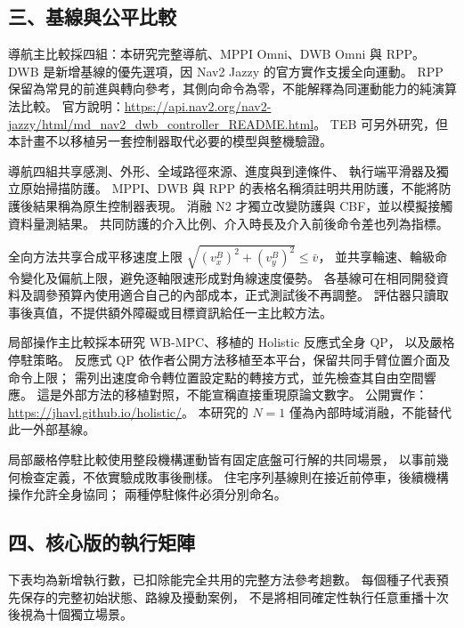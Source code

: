 \subsection*{三、基線與公平比較}

導航主比較採四組：本研究完整導航、MPPI Omni、DWB Omni 與 RPP。
DWB 是新增基線的優先選項，因 Nav2 Jazzy 的官方實作支援全向運動。
RPP 保留為常見的前進與轉向參考，其側向命令為零，不能解釋為同運動能力的純演算法比較。
官方說明：\url{https://api.nav2.org/nav2-jazzy/html/md_nav2_dwb_controller_README.html}。
TEB 可另外研究，但本計畫不以移植另一套控制器取代必要的模型與整機驗證。

導航四組共享感測、外形、全域路徑來源、進度與到達條件、
執行端平滑器及獨立原始掃描防護。
MPPI、DWB 與 RPP 的表格名稱須註明共用防護，不能將防護後結果稱為原生控制器表現。
消融 N2 才獨立改變防護與 CBF，並以模擬接觸資料量測結果。
共同防護的介入比例、介入時長及介入前後命令差也列為指標。

全向方法共享合成平移速度上限
$\sqrt{(v_x^B)^2+(v_y^B)^2}\leq\bar v$，
並共享輪速、輪級命令變化及偏航上限，避免逐軸限速形成對角線速度優勢。
各基線可在相同開發資料及調參預算內使用適合自己的內部成本，正式測試後不再調整。
評估器只讀取事後真值，不提供額外障礙或目標資訊給任一主比較方法。

局部操作主比較採本研究 WB-MPC、移植的 Holistic 反應式全身 QP，
以及嚴格停駐策略。
反應式 QP 依作者公開方法移植至本平台，保留共同手臂位置介面及命令上限；
需列出速度命令轉位置設定點的轉接方式，並先檢查其自由空間響應。
這是外部方法的移植對照，不能宣稱直接重現原論文數字。
公開實作：\url{https://jhavl.github.io/holistic/}。
本研究的 $N=1$ 僅為內部時域消融，不能替代此一外部基線。

局部嚴格停駐比較使用整段機構運動皆有固定底盤可行解的共同場景，
以事前幾何檢查定義，不依實驗成敗事後刪樣。
住宅序列基線則在接近前停車，後續機構操作允許全身協同；
兩種停駐條件必須分別命名。

\subsection*{四、核心版的執行矩陣}

下表均為新增執行數，已扣除能完全共用的完整方法參考趟數。
每個種子代表預先保存的完整初始狀態、路線及擾動案例，
不是將相同確定性執行任意重播十次後視為十個獨立場景。

